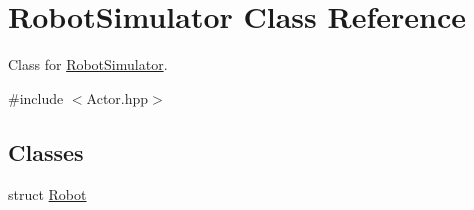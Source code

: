 \hypertarget{classRobotSimulator}{\section{Robot\-Simulator Class Reference}
\label{classRobotSimulator}
}


Class for \hyperlink{classRobotSimulator}{Robot\-Simulator}.  




{\ttfamily \#include $<$Actor.\-hpp$>$}

\subsection*{Classes}
\begin{DoxyCompactItemize}
\item 
struct \hyperlink{structRobotSimulator_1_1Robot}{Robot}
\end{DoxyCompactItemize}
